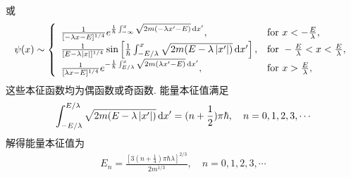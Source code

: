 \documentclass{assignment}
\begin{document}
\begin{sol}
\begin{itemize}
        或
        \begin{align}
            \psi(x)\sim\left\{\begin{array}{ll}
                \frac{1}{[-\lambda x-E]^{1/4}}e^{\frac{1}{\hbar}\int_{-\infty}^x\sqrt{2m(-\lambda x'-E)}\,\mathrm{d}x'},&\text{for }x<-\frac{E}{\lambda},\\
                \frac{1}{[E-\lambda\left\lvert x\right\rvert]^{1/4}}\sin\left[\frac{1}{\hbar}\int_{-E/\lambda}^x\sqrt{2m(E-\lambda\left\lvert x'\right\rvert)}\,\mathrm{d}x'\right],&\text{for }-\frac{E}{\lambda}<x<\frac{E}{\lambda},\\
                \frac{1}{[\lambda x-E]^{1/4}}e^{-\frac{1}{\hbar}\int_{E/\lambda}^x\sqrt{2m(\lambda x'-E)}\,\mathrm{d}x'},&\text{for }x>\frac{E}{\lambda},
            \end{array}\right.
        \end{align}
        这些本征函数均为偶函数或奇函数.
        能量本征值满足
        \begin{align}
            \int_{-E/\lambda}^{E/\lambda}\sqrt{2m(E-\lambda\left\lvert x'\right\rvert)}\,\mathrm{d}x'=(n+\frac{1}{2})\pi\hbar,\quad n=0,1,2,3,\cdots
        \end{align}
        解得能量本征值为
        \begin{align}
            E_n=\frac{\left[3\left(n+\frac{1}{4}\right)\pi\hbar\lambda\right]^{2/3}}{2m^{1/3}},\quad n=0,1,2,3,\cdots
        \end{align}
    \end{itemize}
\end{sol}
\end{document}
